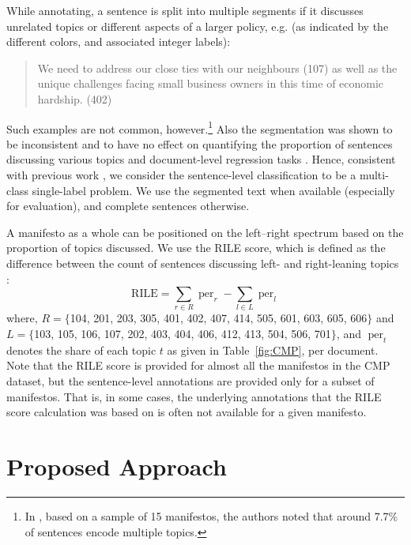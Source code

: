 \documentclass[11pt,a4paper]{article}
\DeclareMathOperator{\per}{per}
\newcommand{\tabref}[2][]{Table#1~\ref{#2}\xspace}
\begin{document}
While annotating, a sentence is split into multiple segments if it discusses unrelated topics or different aspects of a larger policy, e.g. (as indicated by the different colors, and associated integer labels):
\begin{quote}
\color{red}
We need to address our close ties with our neighbours (107) \color{blue} as well as the unique challenges facing small business owners in this time of economic hardship. (402)
\end{quote}
Such examples are not common, however.\footnote{In , based on a sample of 15 manifestos, the authors noted that around 7.7\% of sentences encode multiple topics.} Also the segmentation was shown to be inconsistent and to have no effect on quantifying the proportion of sentences discussing various topics and document-level regression tasks \cite{daubler2012natural}. Hence, consistent with previous work \cite{biessmann2016automating, W17-2906}, we consider the sentence-level classification to be a multi-class single-label problem. We use the segmented text when available (especially for evaluation), and complete sentences otherwise.

A manifesto as a whole can be positioned on the left--right spectrum based on the proportion of topics discussed. We use the RILE score, which is defined as the difference between the count of sentences discussing left- and right-leaning topics \cite{cat}:
\begin{equation}
\text{RILE} = \sum_{r \in R} \per_{r} - \sum_{l \in L} \per_{l}
\end{equation}
where, $R = \{$104, 201, 203, 305, 401, 402, 407, 414, 505, 601, 603, 605, 606$\}$ and $L = \{$103, 105, 106, 107, 202, 403, 404, 406, 412, 413, 504, 506, 701$\}$, and $\per_{t}$ denotes the share of each topic $t$ as given in \tabref{fig:CMP}, per document.  Note that the RILE score is provided for almost all the manifestos in the CMP dataset, but the sentence-level annotations are provided only for a subset of manifestos. That is, in some cases, the underlying annotations that the RILE score calculation was based on is often not available for a given manifesto.



\section{Proposed Approach}
\end{document}
